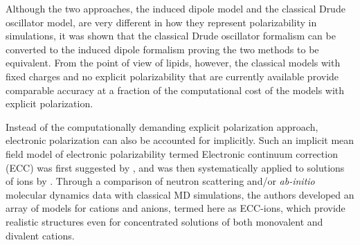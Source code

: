 Although the two approaches, 
the induced dipole model and the classical Drude oscillator model, 
are very different in how they represent polarizability in simulations,
it was shown that the classical Drude oscillator formalism can be converted to the induced dipole formalism 
proving the two methods to be equivalent. \citep{huang2017mapping}
From the point of view of lipids, however, the classical models with fixed charges and no explicit polarizability that are currently available 
provide comparable accuracy at a fraction of the computational cost of the models with explicit polarization. \citep{lucas12,chowdhary13} 

Instead of the computationally demanding explicit polarization approach, 
electronic polarization can also be accounted for implicitly.
Such an implicit mean field model of electronic polarizability 
termed Electronic continuum correction (ECC) 
was first suggested by \citet{leontyev09}, 
and was then systematically applied to solutions of ions by \citet{Pluharova2014, kohagen14, kohagen16, martinek17}. 
Through a comparison of neutron scattering and/or \emph{ab-initio} molecular dynamics data with classical MD simulations, 
the authors developed an array of models for cations and anions, termed here as ECC-ions,
which provide realistic structures even for concentrated solutions of both monovalent and divalent cations. 

